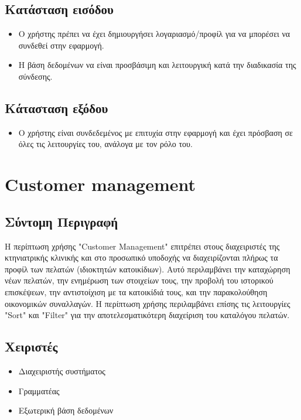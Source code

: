 \documentclass[12pt,a4paper,twoside]{book}
\begin{document}
\subsection{Κατάσταση εισόδου} %
\begin{itemize}
  \item Ο χρήστης πρέπει να έχει δημιουργήσει λογαριασμό/προφίλ για να μπορέσει να συνδεθεί στην εφαρμογή. %
  \item Η βάση δεδομένων να είναι προσβάσιμη και λειτουργική κατά την διαδικασία της σύνδεσης. %
\end{itemize}

\subsection{Κάτασταση εξόδου} %
\begin{itemize}
  \item Ο χρήστης είναι συνδεδεμένος με επιτυχία στην εφαρμογή και έχει πρόσβαση σε όλες τις λειτουργίες του, ανάλογα με τον ρόλο του. %
\end{itemize}

\section{Customer management}

\subsection{Σύντομη Περιγραφή}
Η περίπτωση χρήσης "Customer Management" επιτρέπει στους διαχειριστές της κτηνιατρικής κλινικής και στο προσωπικό υποδοχής να διαχειρίζονται πλήρως τα προφίλ των πελατών (ιδιοκτητών κατοικίδιων). Αυτό περιλαμβάνει την καταχώρηση νέων πελατών, την ενημέρωση των στοιχείων τους, την προβολή του ιστορικού επισκέψεων, την αντιστοίχιση με τα κατοικίδιά τους, και την παρακολούθηση οικονομικών συναλλαγών. Η περίπτωση χρήσης περιλαμβάνει επίσης τις λειτουργίες "Sort" και "Filter" για την αποτελεσματικότερη διαχείριση του καταλόγου πελατών. %

\subsection{Χειριστές}
\begin{itemize}
  \item Διαχειριστής συστήματος
  \item Γραμματέας
  \item Εξωτερική βάση δεδομένων %
\end{itemize}
\end{document}
